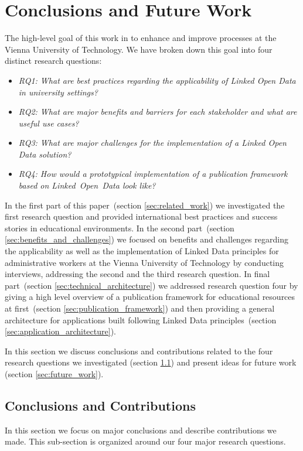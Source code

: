 \documentclass{article}
\begin{document}
\section{Conclusions and Future Work}
The high-level goal of this work in to enhance and improve processes at the Vienna University of Technology. We have broken down this goal
into four distinct research questions:
\begin{itemize}
	\item \textit{RQ1: What are best practices regarding the applicability of Linked Open Data in university settings?}
	\item \textit{RQ2: What are major benefits and barriers for each stakeholder and what are useful use cases?}
	\item \textit{RQ3: What are major challenges for the implementation of a Linked Open Data solution?}
	\item \textit{RQ4: How would a prototypical implementation of a publication framework based on Linked~Open~Data look like?}
\end{itemize}
In the first part of this paper~(section \ref{sec:related_work}) we investigated the first research question and provided international best practices and success stories 
in educational environments. In the second part~(section \ref{sec:benefits_and_challenges}) we focused on benefits and challenges regarding the applicability as well as
the implementation of Linked Data principles for administrative workers at the Vienna University of Technology by conducting interviews, addressing the second and the third research question. In final part~(section \ref{sec:technical_architecture}) we addressed research question four by giving a high level overview of a publication framework for educational resources at first~(section \ref{sec:publication_framework}) and then providing a general architecture for applications built following Linked Data principles~(section \ref{sec:application_architecture}). 

In this section we discuss conclusions and contributions related to the four research questions we investigated (section \ref{sec:conclusions}) and present ideas for future work (section \ref{sec:future_work}). 
\subsection{Conclusions and Contributions}
\label{sec:conclusions}
In this section we focus on major conclusions and describe contributions we made. This sub-section is organized around our four major research questions.
\end{document}
